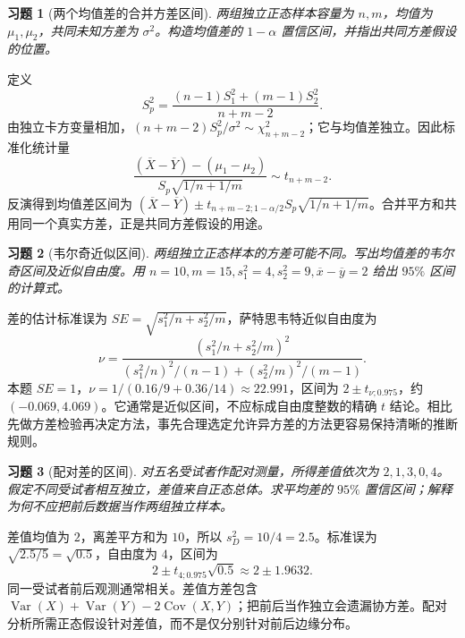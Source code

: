 \documentclass[12pt,fontset=fandol]{ctexart}
\newtheorem{exercise}{习题}[section]
\begin{document}
\begin{exercise}[两个均值差的合并方差区间]\label{q:B13.3}
两组独立正态样本容量为 $n,m$，均值为 $\mu_1,\mu_2$，共同未知方差为 $\sigma^2$。构造均值差的 $1-\alpha$ 置信区间，并指出共同方差假设的位置。\par{}
\end{exercise}

\begin{solve}\label{a:B13.3}定义\[S_p^2=\frac{(n-1)S_1^2+(m-1)S_2^2}{n+m-2}.\]由独立卡方变量相加，$(n+m-2)S_p^2/\sigma^2\sim\chi^2_{n+m-2}$；它与均值差独立。因此标准化统计量\[\frac{(\overline X-\overline Y)-(\mu_1-\mu_2)}{S_p\sqrt{1/n+1/m}}\sim t_{n+m-2}.\]反演得到均值差区间为 $(\overline X-\overline Y)\pm t_{n+m-2;1-\alpha/2}S_p\sqrt{1/n+1/m}$。合并平方和共用同一个真实方差，正是共同方差假设的用途。\end{solve}

\begin{exercise}[韦尔奇近似区间]\label{q:B13.4}
两组独立正态样本的方差可能不同。写出均值差的韦尔奇区间及近似自由度。用 $n=10,m=15,s_1^2=4,s_2^2=9,\overline x-\overline y=2$ 给出 $95\%$ 区间的计算式。\par{}
\end{exercise}

\begin{solve}\label{a:B13.4}差的估计标准误为 $SE=\sqrt{s_1^2/n+s_2^2/m}$，萨特思韦特近似自由度为\[\nu=\frac{(s_1^2/n+s_2^2/m)^2}{(s_1^2/n)^2/(n-1)+(s_2^2/m)^2/(m-1)}.\]本题 $SE=1$，$\nu=1/(0.16/9+0.36/14)\approx22.991$，区间为 $2\pm t_{\nu;0.975}$，约 $(-0.069,4.069)$。它通常是近似区间，不应标成自由度整数的精确 $t$ 结论。相比先做方差检验再决定方法，事先合理选定允许异方差的方法更容易保持清晰的推断规则。\end{solve}

\begin{exercise}[配对差的区间]\label{q:B13.5}
对五名受试者作配对测量，所得差值依次为 $2,1,3,0,4$。假定不同受试者相互独立，差值来自正态总体。求平均差的 $95\%$ 置信区间；解释为何不应把前后数据当作两组独立样本。\par{}
\end{exercise}

\begin{solve}\label{a:B13.5}差值均值为 $2$，离差平方和为 $10$，所以 $s_D^2=10/4=2.5$。标准误为 $\sqrt{2.5/5}=\sqrt{0.5}$，自由度为 $4$，区间为\[2\pm t_{4;0.975}\sqrt{0.5}\approx2\pm1.9632.\]同一受试者前后观测通常相关。差值方差包含 $\operatorname{Var}(X)+\operatorname{Var}(Y)-2\operatorname{Cov}(X,Y)$；把前后当作独立会遗漏协方差。配对分析所需正态假设针对差值，而不是仅分别针对前后边缘分布。\end{solve}
\end{document}
